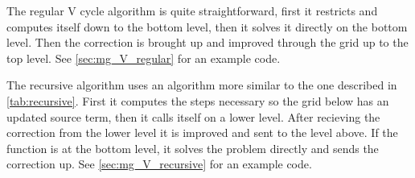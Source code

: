 			The regular V cycle algorithm is quite straightforward, first it restricts and computes itself down to the bottom level,
			then it solves it directly on the bottom level. Then the correction is brought up and improved through the grid up to the top level.
			See \cref{sec:mg_V_regular} for an example code.

			The recursive algorithm uses an algorithm more similar to the one described in \cref{tab:recursive}. First it computes the steps necessary
			so the grid below has an updated source term, then it calls itself on a lower level. After recieving the correction from
			the lower level it is improved and sent to the level above. If the function is at the bottom level, it solves the problem directly and sends
			the correction up. See \cref{sec:mg_V_recursive} for an example code.

